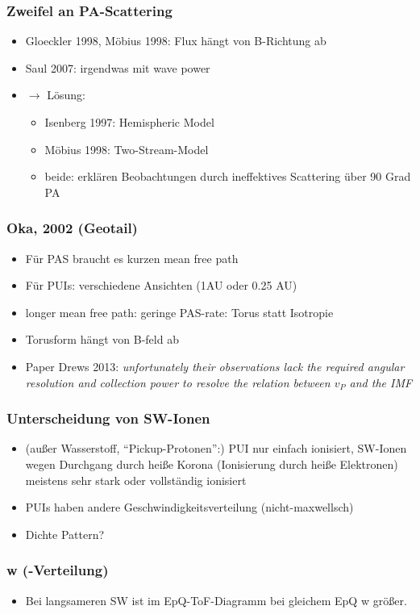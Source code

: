 \documentclass[]{article}
\begin{document}
\subsubsection{Zweifel an PA-Scattering}
\begin{itemize}
	\item Gloeckler 1998, Möbius 1998: Flux hängt von B-Richtung ab
	\item Saul 2007: irgendwas mit wave power
	\item $\rightarrow$ Lösung: \begin{itemize}
	\item Isenberg 1997: Hemispheric Model
	\item Möbius 1998: Two-Stream-Model
	\item beide: erklären Beobachtungen durch ineffektives Scattering über 90 Grad PA
\end{itemize}	 
\end{itemize}
%
\subsubsection{Oka, 2002 (Geotail)}
\begin{itemize}
	\item Für PAS braucht es kurzen mean free path
	\item Für PUIs: verschiedene Ansichten (1AU oder 0.25 AU)
	\item longer mean free path: geringe PAS-rate: Torus statt Isotropie
	\item Torusform hängt von B-feld ab
	\item Paper Drews 2013: \textit{unfortunately their observations lack the required angular resolution and collection power to resolve the relation between $v_P$ and the IMF}
\end{itemize}
%
\subsubsection{Unterscheidung von SW-Ionen}
\begin{itemize}
	\item (außer Wasserstoff, ``Pickup-Protonen'':) PUI nur einfach ionisiert, SW-Ionen wegen Durchgang durch heiße Korona (Ionisierung durch heiße Elektronen) meistens sehr stark oder vollständig ionisiert 
	\item PUIs haben andere Geschwindigkeitsverteilung (nicht-maxwellsch)
	\item Dichte Pattern?
\end{itemize}
%
\subsubsection{w (-Verteilung)}
\begin{itemize}
	\item Bei langsameren SW ist im EpQ-ToF-Diagramm bei gleichem EpQ w größer.
\end{itemize}
%
%
%
\newpage
\end{document}
